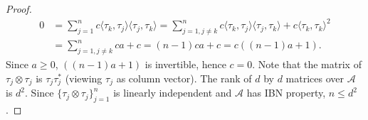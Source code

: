 \documentclass[10pt,a4paper]{amsart}
\begin{document}
\begin{proof}
\begin{align*}
	0&=\sum_{j=1}^{n}c\langle \tau_k, \tau_j\rangle \langle \tau_j, \tau_k \rangle=\sum_{j=1, j\neq k}^nc\langle \tau_k, \tau_j\rangle \langle \tau_j, \tau_k\rangle +c\langle \tau_k, \tau_k\rangle^2\\
	&=\sum_{j=1, j\neq k}^nca+c=(n-1)ca+c=c((n-1)a+1).
\end{align*}
Since $a\geq0$, $((n-1)a+1)$ is invertible, hence $c=0$. Note that  the matrix of $\tau_j \otimes \tau_j$ is $\tau_j \tau_j^*$ (viewing $\tau_j$ as column vector). The rank of $d$ by $d$ matrices over $\mathcal{A}$ is $d^2$. Since $\{\tau_j \otimes \tau_j\}_{j=1}^n$ is linearly independent and $\mathcal{A}$ has IBN property, $n\leq d^2$. 
\end{proof}
\end{document}

